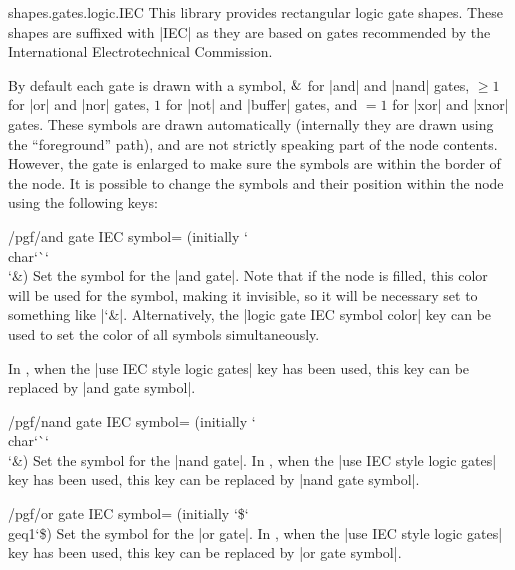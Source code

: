 \begin{pgflibrary}{shapes.gates.logic.IEC}
    This library provides rectangular logic gate shapes. These shapes are
    suffixed with |IEC| as they are based on gates recommended by the
    International Electrotechnical Commission.

    By default each gate is drawn with a symbol, $\char`\&$ for |and| and
    |nand| gates, $\geq1$ for |or| and |nor| gates, $1$ for |not| and |buffer|
    gates, and $=1$ for |xor| and |xnor| gates. These symbols are drawn
    automatically (internally they are drawn using the ``foreground'' path),
    and are not strictly speaking part of the node contents. However, the gate
    is enlarged to make sure the symbols are within the border of the node. It
    is possible to change the symbols and their position within the node using
    the following keys:

    \begin{key}{/pgf/and gate IEC symbol= (initially \char`\\char\char`\`\char`\\\char`\&)}
        Set the symbol for the |and gate|. Note that if the node is filled,
        this color will be used for the symbol, making it invisible, so it will
        be necessary set  to something like |\color{black}\char`\&|.
        Alternatively, the |logic gate IEC symbol color| key can be used to set
        the color of all symbols simultaneously.

        In \tikzname, when the |use IEC style logic gates| key has been used,
        this key can be replaced by |and gate symbol|.
    \end{key}

    \begin{key}{/pgf/nand gate IEC symbol= (initially \char`\\char\char`\`\char`\\\char`\&)}
        Set the symbol for the |nand gate|. In \tikzname, when the
        |use IEC style logic gates| key has been used, this key can be replaced
        by |nand gate symbol|.
    \end{key}

    \begin{key}{/pgf/or gate IEC symbol= (initially \char`\$\char`\\geq1\char`\$)}
        Set the symbol for the |or gate|. In \tikzname, when the
        |use IEC style logic gates| key has been used, this key can be replaced
        by |or gate symbol|.
    \end{key}


\end{pgflibrary}
